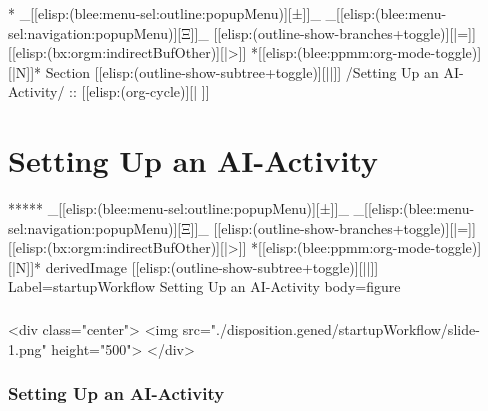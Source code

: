 \begin{whenOrg}
\begin{whenOrg}
*  _[[elisp:(blee:menu-sel:outline:popupMenu)][±]]_ _[[elisp:(blee:menu-sel:navigation:popupMenu)][Ξ]]_ [[elisp:(outline-show-branches+toggle)][|=]] [[elisp:(bx:orgm:indirectBufOther)][|>]] *[[elisp:(blee:ppmm:org-mode-toggle)][|N]]*  Section    [[elisp:(outline-show-subtree+toggle)][||]]   /Setting Up an AI-Activity/ ::  [[elisp:(org-cycle)][| ]]
\end{whenOrg}

\section{Setting Up an AI-Activity}

\begin{whenOrg}
*****  _[[elisp:(blee:menu-sel:outline:popupMenu)][±]]_ _[[elisp:(blee:menu-sel:navigation:popupMenu)][Ξ]]_ [[elisp:(outline-show-branches+toggle)][|=]] [[elisp:(bx:orgm:indirectBufOther)][|>]] *[[elisp:(blee:ppmm:org-mode-toggle)][|N]]*  derivedImage [[elisp:(outline-show-subtree+toggle)][||]] Label=startupWorkflow Setting Up an AI-Activity body=figure
\end{whenOrg}

\begin{htmlonly}

\begin{frame}[fragile,plain,label=startupWorkflow]
    \frametitle{}
    \framesubtitle{}
    \begin{rawhtml}
<div class="center">
<img src="./disposition.gened/startupWorkflow/slide-1.png" height="500">
</div>
    \end{rawhtml}
\end{frame}
\end{htmlonly}

\begin{verblatex}

\begin{frame}[fragile,plain,label=startupWorkflow]
    \frametitle{Setting Up an AI-Activity}
    \framesubtitle{}


\end{frame}
\end{verblatex}
\end{whenOrg}
